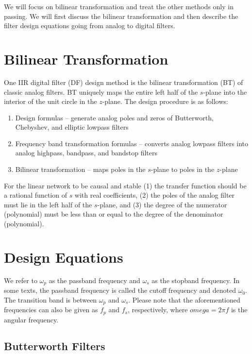\documentclass[11pt]{book}
\theoremstyle{example}
\begin{document}
We will focus on bilinear transformation and treat the other methods only in passing. We will first discuss the bilinear transformation and then describe the filter design equations going from analog to digital filters.

\section{Bilinear Transformation}

One IIR digital filter (DF) design method is the bilinear transformation (BT) of classic analog filters. BT uniquely maps the entire left half of the $s$-plane into the interior of the unit circle in the $z$-plane. The design procedure is as follows:
\begin{enumerate}
	\item Design formulas -- generate analog poles and zeros of Butterworth, Chebyshev, and elliptic lowpass filters
	\item Frequency band transformation formulas -- converts analog lowpass filters into analog highpass, bandpass, and bandstop filters
	\item Bilinear transformation -- maps poles in the $s$-plane to poles in the $z$-plane
\end{enumerate}

For the linear network to be causal and stable (1) the transfer function should be a rational function of $s$ with real coefficients, (2) the poles of the analog filter must lie in the left half of the $s$-plane, and (3) the degree of the numerator (polynomial) must be less than or equal to the degree of the denominator (polynomial).

\section{Design Equations}

We refer to $\omega_p$ as the passband frequency and $\omega_s$ as the stopband frequency. In some texts, the passband frequency is called the cutoff frequency and denoted $\omega_0$. The transition band is between $\omega_p$ and $\omega_s$. Please note that the aforementioned frequencies can also be given as $f_p$ and $f_s$, respectively, where $omega=2{\pi}f$ is the angular frequency. 

\subsection{Butterworth Filters}
\end{document}
